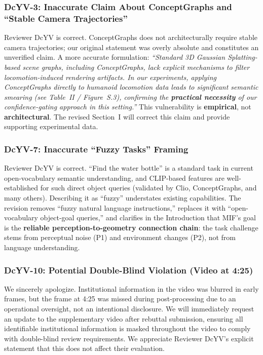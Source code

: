 \documentclass[10pt,a4paper]{article}
\begin{document}
\subsubsection*{DcYV-3: Inaccurate Claim About ConceptGraphs and ``Stable Camera Trajectories''}

Reviewer DcYV is correct. ConceptGraphs does not architecturally require stable camera trajectories; our original statement was overly absolute and constitutes an unverified claim. A more accurate formulation: \textit{``Standard 3D Gaussian Splatting-based scene graphs, including ConceptGraphs, lack explicit mechanisms to filter locomotion-induced rendering artifacts. In our experiments, applying ConceptGraphs directly to humanoid locomotion data leads to significant semantic smearing (see Table~II / Figure~S.3), confirming the \textbf{practical necessity} of our confidence-gating approach in this setting.''} This vulnerability is \textbf{empirical}, not \textbf{architectural}. The revised Section~I will correct this claim and provide supporting experimental data.

\subsubsection*{DcYV-7: Inaccurate ``Fuzzy Tasks'' Framing}

Reviewer DcYV is correct. ``Find the water bottle'' is a standard task in current open-vocabulary semantic understanding, and CLIP-based features are well-established for such direct object queries (validated by Clio, ConceptGraphs, and many others). Describing it as ``fuzzy'' understates existing capabilities. The revision removes ``fuzzy natural language instructions,'' replaces it with ``open-vocabulary object-goal queries,'' and clarifies in the Introduction that MIF's goal is the \textbf{reliable perception-to-geometry connection chain}: the task challenge stems from perceptual noise (P1) and environment changes (P2), not from language understanding.

\subsubsection*{DcYV-10: Potential Double-Blind Violation (Video at 4:25)}

We sincerely apologize. Institutional information in the video was blurred in early frames, but the frame at 4:25 was missed during post-processing due to an operational oversight, not an intentional disclosure. We will immediately request an update to the supplementary video after rebuttal submission, ensuring all identifiable institutional information is masked throughout the video to comply with double-blind review requirements. We appreciate Reviewer DcYV's explicit statement that this does not affect their evaluation.
\end{document}
